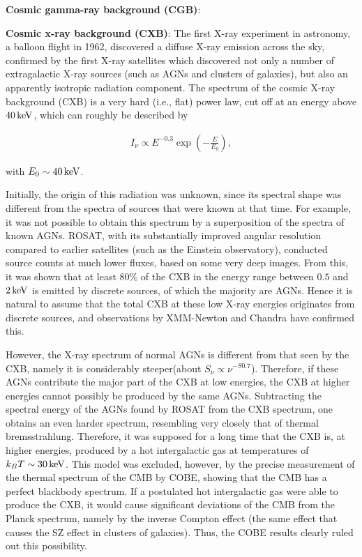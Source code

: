 \documentclass[a4paper,11pt]{article}
\begin{document}
{\noindent}\textbf{Cosmic gamma-ray background (CGB)}: 

{\noindent}\textbf{Cosmic x-ray background (CXB)}: The first X-ray experiment in astronomy, a balloon flight in 1962, discovered a diffuse X-ray emission across the sky, confirmed by the first X-ray satellites which discovered not only a number of extragalactic X-ray sources (such as AGNs and clusters of galaxies), but also an apparently isotropic radiation component. The spectrum of the cosmic X-ray background (CXB) is a very hard (i.e., flat) power law, cut off at an energy above $40\,{\rm keV}$, which can roughly be described by

\begin{align*}
    I_\nu \propto E^{-0.3}\exp\left(-\frac{E}{E_0}\right),
\end{align*}

{\noindent}with $E_0\sim40\,{\rm keV}$. 

{\noindent}Initially, the origin of this radiation was unknown, since its spectral shape was different from the spectra of sources that were known at that time. For example, it was not possible to obtain this spectrum by a superposition of the spectra of known AGNs. ROSAT, with its substantially improved angular resolution compared to earlier satellites (such as the Einstein observatory), conducted source counts at much lower fluxes, based on some very deep images. From this, it was shown that at least 80\% of the CXB in the energy range between $0.5$ and $2\,{\rm keV}$ is emitted by discrete sources, of which the majority are AGNs. Hence it is natural to assume that the total CXB at these low X-ray energies originates from discrete sources, and observations by XMM-Newton and Chandra have confirmed this.

{\noindent}However, the X-ray spectrum of normal AGNs is different from that seen by the CXB, namely it is considerably steeper(about $S_\nu\propto\nu^{-S0.7}$). Therefore, if these AGNs contribute the major part of the CXB at low energies, the CXB at higher energies cannot possibly be produced by the same AGNs. Subtracting the spectral energy of the AGNs found by ROSAT from the CXB spectrum, one obtains an even harder spectrum, resembling very closely that of thermal bremsstrahlung. Therefore, it was supposed for a long time that the CXB is, at higher energies, produced by a hot intergalactic gas at temperatures of $k_BT\sim30\,{\rm keV}$. This model was excluded, however, by the precise measurement of the thermal spectrum of the CMB by COBE, showing that the CMB has a perfect blackbody spectrum. If a postulated hot intergalactic gas were able to produce the CXB, it would cause significant deviations of the CMB from the Planck spectrum, namely by the inverse Compton effect (the same effect that causes the SZ effect in clusters of galaxies). Thus, the COBE results clearly ruled out this possibility.
\end{document}
